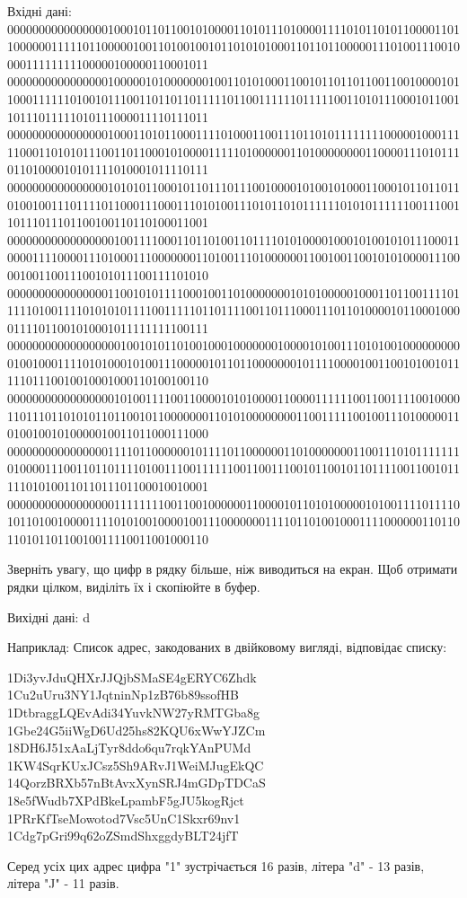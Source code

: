 \documentclass[]{article}
\begin{document}
\begin{enumerate}
Вхідні дані: 
00000000000000001000101101100101000011010111010000111101011010110000110110000001111101100000100110100100101101010100011011011000001110100111001000011111111100000100000110001011
00000000000000001000001010000000100110101000110010110110110011001000010110001111110100101110011011011011111011001111110111110011010111000101100110111011111010111000011110111011
00000000000000001000110101100011110100011001110110101111111100000100011111000110101011100110110001010000111110100000011010000000011000011101011101101000010101111010001011110111
00000000000000001010101100010110111011100100001010010100011000101101101101001001110111101100011100011101010011101011010111111010101111110011100110111011101100100110110100011001
00000000000000000100111100011011010011011110101000010001010010101110001100001111000011101000111000000011010011101000000110010011001010100001110000100110011100101011100111101010
00000000000000001100101011110001001101000000010101000001000110110011110111110100111101010101111001111101101111001101110001110110100001011000100001111011001010001011111111100111
00000000000000000010010101101001000100000001000010100111010100100000000001001000111101010001010011100000101101100000001011110000100110010100101111101110010010001000110100100110
00000000000000000101001111001100001010100001100001111110011001111001000011011101101010110110010110000000110101000000001100111110010011101000001101001001010000010011011000111000
00000000000000001111011000000101111011000000110100000001100111010111111101000011100110110111101001110011111100110011100101100101101111001100101111101010011011011101100010010001
00000000000000000111111110011001000000110000101101010000010100111101111010110100100001111010100100001001110000000111101101001000111100000011011011010110110010011110011001000110

Зверніть увагу, що цифр в рядку більше, ніж виводиться на екран. 
Щоб отримати рядки цілком, виділіть їх і скопіюйте в буфер.

Вихідні дані:
d

Наприклад:
Список адрес, закодованих в двійковому вигляді, відповідає списку: 

1Di3yvJduQHXrJJQjbSMaSE4gERYC6Zhdk
1Cu2uUru3NY1JqtninNp1zB76b89ssofHB
1DtbraggLQEvAdi34YuvkNW27yRMTGba8g
1Gbe24G5iiWgD6Ud25hs82KQU6xWwYJZCm
18DH6J51xAaLjTyr8ddo6qu7rqkYAnPUMd
1KW4SqrKUxJCsz5Sh9ARvJ1WeiMJugEkQC
14QorzBRXb57nBtAvxXynSRJ4mGDpTDCaS
18e5fWudb7XPdBkeLpambF5gJU5kogRjct
1PRrKfTseMowotod7Vsc5UnC1Skxr69nv1
1Cdg7pGri99q62oZSmdShxggdyBLT24jfT

Серед усіх цих адрес цифра "1" зустрічається 16 разів, літера "d" - 13 разів, літера "J" - 11 разів.


\end{enumerate}
\end{document}
